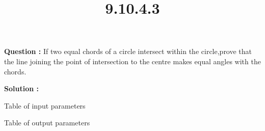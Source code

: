 \documentclass[12pt]{article}
\begin{document}
\title{\textbf{9.10.4.3}}
\date{}
\maketitle
\textbf{Question :} If two equal chords of a circle intersect within the circle,prove that the line joining the point of intersection to the centre makes equal angles with the chords.

\textbf{Solution :}

\begin{table}[H]
    \centering
   
    \caption{Table of input parameters}
    \label{tab:tab:9.10.4.3.1}
\end{table}

\begin{table}[H]
    \centering

\caption{Table of output parameters}
    \label{tab:tab:9.10.4.3.2}
\end{table}
\end{document}
